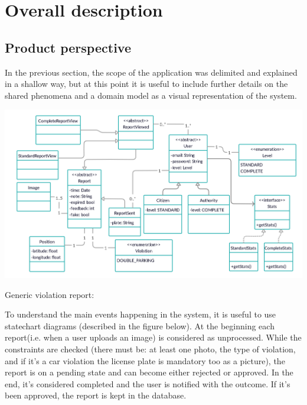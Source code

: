 \documentclass[../RASD.tex]{subfiles}
\begin{document}
    \chapter{Overall description}\label{ch:overall-description}
    \section{Product perspective}\label{sec:product-perspective}
    In the previous section, the scope of the application was delimited and explained in a shallow way, but at this point it is useful to include further details on the shared phenomena and a domain model as a visual representation of the system.
    \begin{center}
        \includegraphics[scale = 0.85]{assets/domainModel.png}\\[1.6 cm]
    \end{center}

    Generic violation report:

    To understand the main events happening in the system, it is useful to use statechart diagrams (described in the figure below). At the beginning each report(i.e. when a user uploads an image) is considered as unprocessed. While the constraints are checked (there must be: at least one photo, the type of violation, and if it’s a car violation the license plate is mandatory too as a picture), the report is on a pending state and can become either rejected or approved. In the end, it’s considered completed and the user is notified with the outcome. If it’s been approved, the report is kept in the database.
\end{document}
